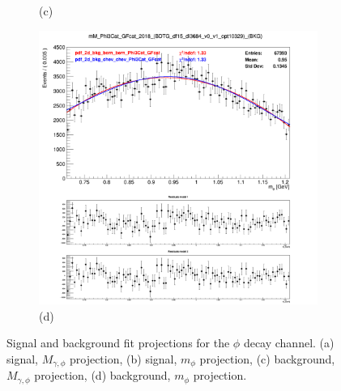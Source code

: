 \begin{figure}[!ht]
\begin{subfigure}[t]{0.50\mylength}
        \caption{\footnotesize (c)}
    \end{subfigure}%
    \begin{subfigure}[t]{0.50\mylength}
        \centering
        \includegraphics[width=0.45\mylength]{resources/plots/Phi3_fit_BKG_MM.png}
        \caption{\footnotesize (d)}
    \end{subfigure}%
\caption{Signal and background fit projections for the $\phi$ decay channel. (a) signal, $M_{\gamma, \phi}$ projection, (b) signal, $m_{\phi}$ projection, (c) background, $M_{\gamma, \phi}$ projection, (d) background, $m_{\phi}$ projection.}
\label{fig:sig_bkg_modelling_phi}
    \vspace*{-0.0cm}
\end{figure}

